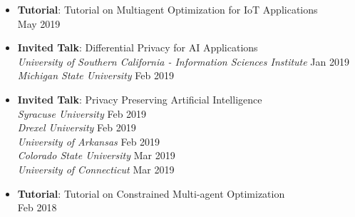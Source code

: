 \begin{itemize}
  \item {\bf Tutorial}: {Tutorial on Multiagent Optimization for IoT Applications}\\ 
  \hfill {May 2019}

  \item {\bf Invited Talk}: Differential Privacy for AI Applications\\
  {\em University of Southern California - Information Sciences Institute} \hfill {Jan 2019}\\
  {\em Michigan State University} \hfill {Feb 2019}

  \item {\bf Invited Talk}: Privacy Preserving Artificial Intelligence\\
  {\em Syracuse University} \hfill {Feb 2019}\\
  {\em Drexel University} \hfill {Feb 2019}\\
  {\em University of Arkansas} \hfill {Feb 2019}\\
  {\em Colorado State University} \hfill {Mar 2019}\\
  {\em University of Connecticut} \hfill {Mar 2019}






	\item {\bf Tutorial}: {Tutorial on Constrained Multi-agent Optimization}\\
  	\hfill {Feb 2018}


\end{itemize}

